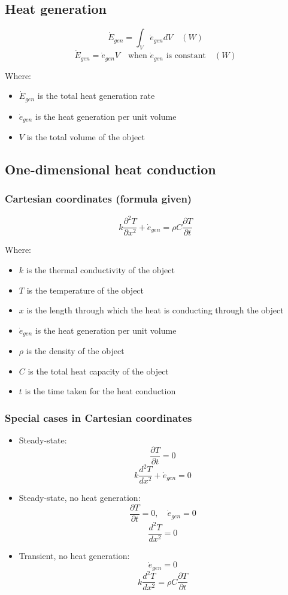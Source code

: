 \documentclass[11pt]{article}
\begin{document}
\subsection{Heat generation}
\label{sec:org22e4e54}
\[\dot{E}_{gen} = \int_V \dot{e}_{gen} dV \quad (\unit{W})\]
\[\dot{E}_{gen} = \dot{e}_{gen} V \quad \text{when } \dot{e}_{gen} \text{ is constant} \quad (\unit{W})\]

Where:
\begin{itemize}
\item \(\dot{E}_{gen}\) is the total heat generation rate
\item \(\dot{e}_{gen}\) is the heat generation per unit volume
\item \(V\) is the total volume of the object
\end{itemize}
\subsection{One-dimensional heat conduction}
\label{sec:org4d314c7}

\subsubsection{Cartesian coordinates (formula given)}
\label{sec:org6527f6f}
\[k \frac{\partial^2 T}{\partial x^2} + \dot{e}_{gen} = \rho C \frac{\partial T}{\partial t}\]

Where:
\begin{itemize}
\item \(k\) is the thermal conductivity of the object
\item \(T\) is the temperature of the object
\item \(x\) is the length through which the heat is conducting through the object
\item \(\dot{e}_{gen}\) is the heat generation per unit volume
\item \(\rho\) is the density of the object
\item \(C\) is the total heat capacity of the object
\item \(t\) is the time taken for the heat conduction
\end{itemize}

 \newpage
\subsubsection{Special cases in Cartesian coordinates}
\label{sec:org6da6654}
\begin{itemize}
\item Steady-state:
\[\frac{\partial T}{\partial t} = 0\]
\[k \frac{d^2 T}{dx^2} + \dot{e}_{gen} = 0\]
\item Steady-state, no heat generation:
\[\frac{\partial T}{\partial t} = 0, \quad \dot{e}_{gen} = 0\]
\[\frac{d^2 T}{dx^2} = 0\]
\item Transient, no heat generation:
\[\dot{e}_{gen} = 0\]
\[k \frac{d^2 T}{dx^2} = \rho C \frac{\partial T}{\partial t}\]
\end{itemize}
\end{document}
